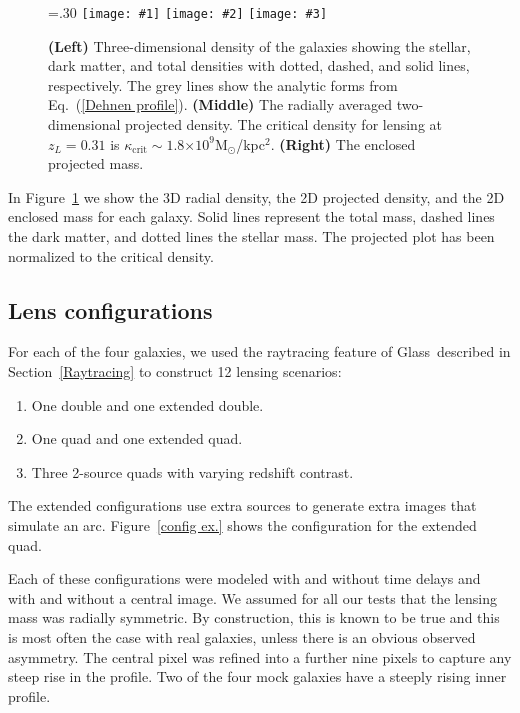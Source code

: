 \documentclass[onecolumn,galley]{mn2e}
\newcommand{\Glass}{{\sc Glass}}
\newcommand{\Msun}{\ensuremath{\mathrm{M}_\odot}}
\newcommand{\figref}[1] {Figure~\ref{#1}}
\newcommand{\eqnref}[1] {Eq.~(\ref{#1})}
\newcommand{\secref}[1] {Section~\ref{#1}}
\newcommand{\e}[1]{\ensuremath{\times 10^{#1}}}
\newcommand\plotthree[3]{{%
 \centering
 \leavevmode
 \columnwidth=.30\columnwidth
 \texttt{[image: \#1]}%
 \hfil
 \texttt{[image: \#2]}%
 \hfil
 \texttt{[image: \#3]}%
}}%
\begin{document}
\begin{figure}
\plotthree{MockGalProfile-a.pdf} {MockGalProfile-b.pdf} {MockGalProfile-c.pdf}
\caption{
\textbf{(Left)} 
Three-dimensional density of the galaxies showing the stellar, dark matter,
and total densities with dotted, dashed, and solid lines, respectively. The
grey lines show the analytic forms from \eqnref{Dehnen profile}. 
\textbf{(Middle)} 
The radially averaged two-dimensional projected density.
The critical density for lensing at $z_L=0.31$ is $\kappa_\mathrm{crit}\sim 1.8\e{9}$\Msun/kpc$^2$.
\textbf{(Right)}
The enclosed projected mass.
}
\label{mock galaxies}
\end{figure}

In \figref{mock galaxies} we show the 3D radial density, 
the 2D projected density, and the 2D enclosed mass for each
galaxy. Solid lines represent the total mass, dashed lines the dark 
matter, and dotted lines the stellar mass. The projected plot has
been normalized to the critical density.

\subsection{Lens configurations} %

For each of the four galaxies, we used the raytracing feature of \Glass\
described in \secref{Raytracing} to construct 12 lensing scenarios:

\begin{enumerate}
\item One double and one extended double.
\item One quad and one extended quad.
\item Three 2-source quads with varying redshift contrast.
\end{enumerate}

The extended configurations use extra sources to generate extra images that
simulate an arc. \figref{config ex.} shows the configuration for the extended
quad.

Each of these configurations were modeled with and without time delays and with
and without a central image. We assumed for all our tests that the lensing mass
was radially symmetric. By construction, this is known to be true and this is
most often the case with real galaxies, unless there is an obvious observed
asymmetry. The central pixel was refined into a further nine pixels to capture
any steep rise in the profile. Two of the four mock galaxies have a steeply rising
inner profile.
\end{document}
